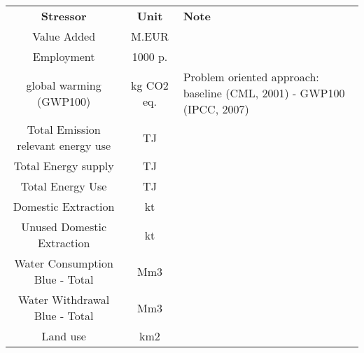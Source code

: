\begin{table}
\label{tab:cc_stressors}
\begin{tabular}{ c c l }
\textbf{Stressor}                                                                                    & \textbf{Unit } & \textbf{Note}\\
Value Added                                                                                          & M.EUR          &                                                  \\
Employment                                                                                           & 1000 p.        &                                                  \\
global warming (GWP100)                                                                              & kg CO2 eq.     & Problem oriented approach: baseline (CML, 2001) - GWP100 (IPCC, 2007)\\
Total Emission relevant energy use                                                                   & TJ             &                                                  \\
Total Energy supply                                                                                  & TJ             &                                                  \\
Total Energy Use                                                                                     & TJ             &                                                  \\
Domestic Extraction                                                                                  & kt             &                                                  \\
Unused Domestic Extraction                                                                           & kt             &                                                  \\
Water Consumption Blue - Total                                                                       & Mm3            &                                                  \\
Water Withdrawal Blue - Total                                                                        & Mm3            &                                                  \\
Land use                                                                                             & km2            &                                                  \\

\end{tabular}
\end{table}
